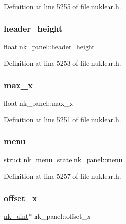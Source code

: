 Definition at line 5255 of file nuklear.\+h.

\mbox{\label{structnk__panel_afd450a3ec4982561df129e6ef610efc8}} 
\subsubsection{\texorpdfstring{header\+\_\+height}{header\_height}}
{\footnotesize\ttfamily float nk\+\_\+panel\+::header\+\_\+height}



Definition at line 5253 of file nuklear.\+h.

\mbox{\label{structnk__panel_ae5077b921e52862b991798c89ec1c12a}} 
\subsubsection{\texorpdfstring{max\+\_\+x}{max\_x}}
{\footnotesize\ttfamily float nk\+\_\+panel\+::max\+\_\+x}



Definition at line 5251 of file nuklear.\+h.

\mbox{\label{structnk__panel_a328ce831e11cefc6308d1dcb0c124771}} 
\subsubsection{\texorpdfstring{menu}{menu}}
{\footnotesize\ttfamily struct \mbox{\hyperlink{structnk__menu__state}{nk\+\_\+menu\+\_\+state}} nk\+\_\+panel\+::menu}



Definition at line 5257 of file nuklear.\+h.

\mbox{\label{structnk__panel_a2aced4e49f290e87ed6c2823122d946c}} 
\subsubsection{\texorpdfstring{offset\+\_\+x}{offset\_x}}
{\footnotesize\ttfamily \mbox{\hyperlink{nuklear_8h_a951b598a3101b6d2a55d22ac39f57919}{nk\+\_\+uint}}$\ast$ nk\+\_\+panel\+::offset\+\_\+x}



